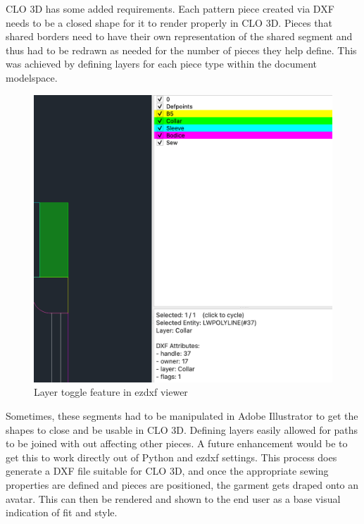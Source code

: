 CLO 3D has some added requirements. Each pattern piece created via DXF needs to be a closed shape for it to render properly in CLO 3D. Pieces that shared borders need to have their own representation of the shared segment and thus had to be redrawn as needed for the number of pieces they help define. This was achieved by defining layers for each piece type within the document modelspace.

\begin{figure} [H] %
    \centering %
    \includegraphics[width = \textwidth]{Images/dxf viewer.png} %
    \caption{Layer toggle feature in ezdxf viewer}
\end{figure}

Sometimes, these segments had to be manipulated in Adobe Illustrator to get the shapes to close and be usable in CLO 3D. Defining layers easily allowed for paths to be joined with out affecting other pieces. A future enhancement would be to get this to work directly out of Python and ezdxf settings. This process does generate a DXF file suitable for CLO 3D, and once the appropriate sewing properties are defined and pieces are positioned, the garment gets draped onto an avatar. This can then be rendered and shown to the end user as a base visual indication of fit and style.

